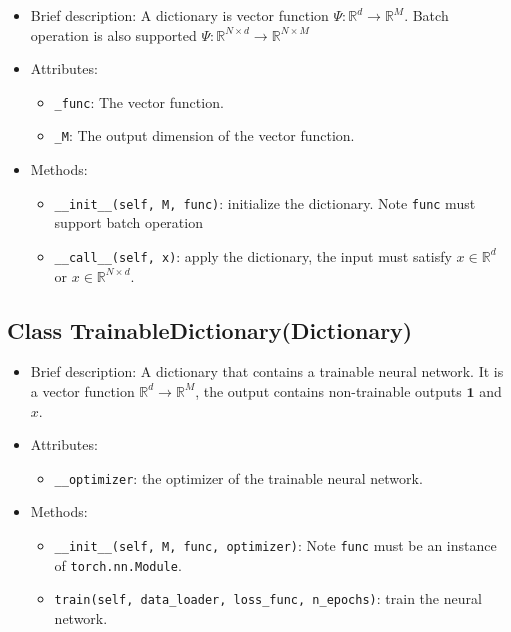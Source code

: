 \documentclass[en, bibend=bibtex]{elegantpaper}
\theoremstyle{plain}
\begin{document}
\begin{itemize}
\item Brief description: A dictionary is vector function
  $\Psi: \mathbb{R}^d \rightarrow \mathbb{R}^M$.
  Batch operation is also supported $\Psi: \mathbb{R}^{N \times d} \rightarrow
  \mathbb{R}^{N \times M}$
\item Attributes:
  \begin{itemize}
  \item \lstinline|_func|: The vector function.
  \item \lstinline|_M|: The output dimension of the vector function.
  \end{itemize}
\item Methods:
  \begin{itemize}
  \item \lstinline|__init__(self, M, func)|: initialize the dictionary.
    Note \lstinline|func| must support batch operation
  \item \lstinline|__call__(self, x)|: apply the dictionary,
    the input must satisfy $x \in \mathbb{R}^d$ or $x \in \mathbb{R}^{N \times d}$.
  \end{itemize}
\end{itemize}

\subsection{Class TrainableDictionary(Dictionary)}

\begin{itemize}
\item Brief description: A dictionary that contains a trainable neural network.
  It is a vector function $\mathbb{R}^d \rightarrow \mathbb{R}^M$,
  the output contains non-trainable outputs $\mathbf{1}$ and $x$.
\item Attributes:
  \begin{itemize}
  \item \lstinline|__optimizer|: the optimizer of the trainable neural network.
  \end{itemize}
\item Methods:
  \begin{itemize}
  \item \lstinline|__init__(self, M, func, optimizer)|:
  Note \lstinline|func| must be an instance of \lstinline|torch.nn.Module|.
  \item \lstinline|train(self, data_loader, loss_func, n_epochs)|:
  train the neural network.
  \end{itemize}
\end{itemize}
\end{document}
